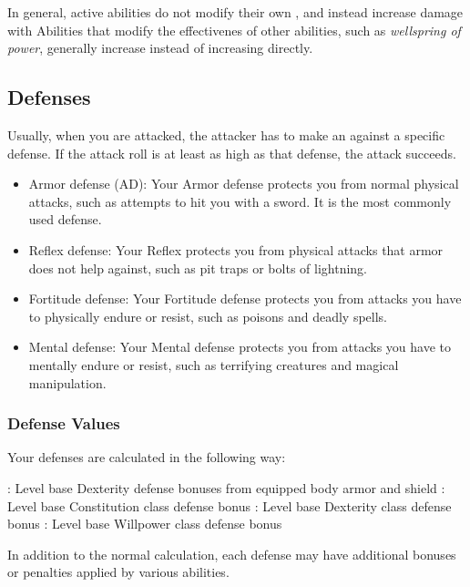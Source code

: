             In general, active abilities do not modify their own , and instead increase damage with 
            Abilities that modify the effectivenes of other abilities, such as \textit{wellspring of power}, generally increase  instead of increasing  directly.

    \subsection{Defenses}\label{Defenses}
        Usually, when you are attacked, the attacker has to make an  against a specific defense.
        If the attack roll is at least as high as that defense, the attack succeeds.
        \begin{itemize}
            \item Armor defense (AD): Your Armor defense protects you from normal physical attacks, such as attempts to hit you with a sword.
                It is the most commonly used defense.
            \item Reflex defense: Your Reflex protects you from physical attacks that armor does not help against, such as pit traps or bolts of lightning.
            \item Fortitude defense: Your Fortitude defense protects you from attacks you have to physically endure or resist, such as poisons and deadly spells.
            \item Mental defense: Your Mental defense protects you from attacks you have to mentally endure or resist, such as terrifying creatures and magical manipulation.
        \end{itemize}

        \subsubsection{Defense Values}\label{Defense Values}

            Your defenses are calculated in the following way:
            \begin{itemize}
                : Level \add base Dexterity \add defense bonuses from equipped body armor and shield
                : Level \add base Constitution \add class defense bonus
                : Level \add base Dexterity \add class defense bonus
                : Level \add base Willpower \add class defense bonus
            \end{itemize}
            In addition to the normal calculation, each defense may have additional bonuses or penalties applied by various abilities.

